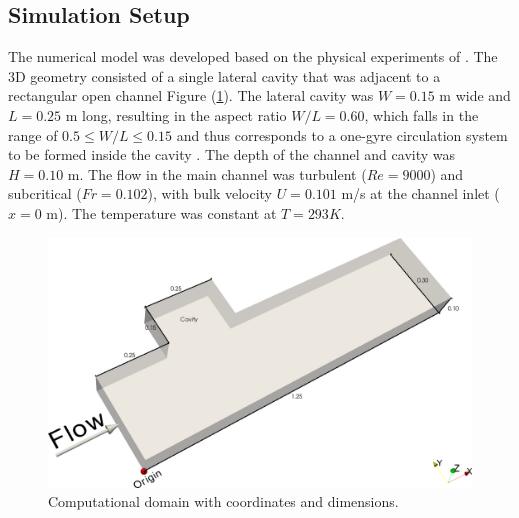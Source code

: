 \subsection{Simulation Setup}
The numerical model was developed based on the physical experiments of \textcite{xiang2019}. The 3D geometry consisted of a single lateral cavity that was adjacent to a rectangular open channel Figure (\ref{fig:art4:domain}). The lateral cavity was $W=0.15$ m wide and $L = 0.25$ m long, resulting in the aspect ratio $W/L=0.60$, which falls in the range of $0.5\leq W/L\leq 0.15$ and thus corresponds to a one-gyre circulation system to be formed inside the cavity \textcite{Uijttewaal2001}. The depth of the channel and cavity was $H=0.10$ m. The flow in the main channel was turbulent ($Re=9000$) and subcritical ($Fr=0.102$), with bulk velocity $U = 0.101$ m/s at the channel inlet ($x=0$ m). The temperature was constant at $T=293K$.

\begin{figure}[!ht]
\centering
\includegraphics[width=\linewidth]{../images/art4/domain.png}
\caption{Computational domain with coordinates and dimensions.}
\label{fig:art4:domain}
\end{figure}

